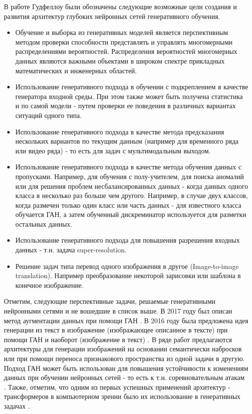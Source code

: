 \documentclass[12pt]{article}
\begin{document}
\begin{sloppypar}
В работе \cite{goodfellow2016nips}  Гудфеллоу были обозначены следующие возможные цели создания и развития архитектур глубоких нейронных сетей генеративного обучения.
\begin{itemize} \itemsep 0em
    \item Обучение и выборка из генеративных моделей является перспективным методом проверки способности  представлять и управлять многомерными распределениями вероятностей. Распределения вероятностей многомерных данных являются важными объектами в широком спектре прикладных математических и инженерных областей.
    \item Использование генеративного подхода в обучении с подкреплением в качестве генератора входной среды. При этом также может быть получена статистика и по самой модели - путем проверки ее поведения в различных вариантах ситуаций одного типа.
    \item Использование генеративного подхода в качестве метода предсказания нескольких вариантов по текущим данным (например для временного ряда или видео ряда) - то есть для задач с мультимодальным выходом.
    \item Использование генеративного подхода в качестве метода обучения данных с пропусками. Например, для обучения с полу-учителем, для поиска аномалий или для решения проблем несбалансированных данных - когда данных одного класса в несколько раз больше чем другого. Например, в случае двух классов, когда размечен только один класс или часть данных - для известного класса обучается ГАН, а затем обученный дискреминатор используется для разметки остальных данных. 
    \item Использование генеративного подхода для повышения разрешения входных данных - т.н. задача super-resolution.
    \item Решение задач типа перевод одного изображения  в другое (Image-to-image translation). Например преобразование некоторой зарисовки или шаблона в конечное изображение.
\end{itemize}

Отметим, следующие перспективные задачи, решаемые генеративными нейронными сетями и не вошедшие в список выше. В 2017 году был описан метод аугментации данных при помощи ГАН \cite{antoniou2017data}. В 2016 году была предложена идея генерации из текст в изображение (изображающее описанное в тексте) при помощи ГАН \cite{reed2016generative} и наоборот (изображение в текст) \cite{he2017deep}. В ряде работ предлагаются архитектуры для генерации изображений на основании семантически набросков \cite{park2019semantic} или при помощи переноса признакового пространства из одной задачи в другую.  Подход ГАН может быть использован для повышения устойчивости к изменениям данных при обучении нейронных сетей  - то есть к т.н. соревновательным атакам \cite{bai2020ai}. Также,  отметим, что одним из первых успешных применений архитектур - трансформеров в компьютерном зрении было их использование в генеративных задачах \cite{parmar2018image}. 


\end{sloppypar}
\end{document}
